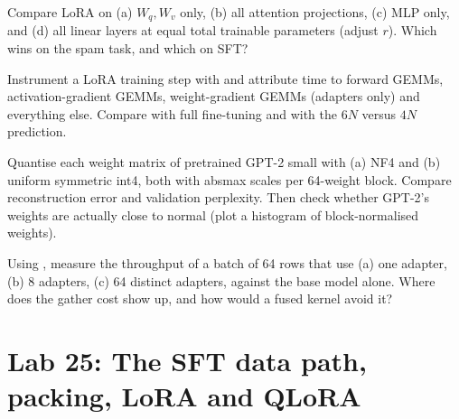 \begin{exercise}
Compare LoRA on (a) $W_q,W_v$ only, (b) all attention projections, (c) MLP only, and
(d) all linear layers at equal total trainable parameters (adjust $r$). Which wins on
the spam task, and which on SFT?
\end{exercise}

\begin{exercise}
Instrument a LoRA training step with  and attribute time to
forward GEMMs, activation-gradient GEMMs, weight-gradient GEMMs (adapters only) and
everything else. Compare with full fine-tuning and with the $6N$ versus $4N$
prediction.
\end{exercise}

\begin{exercise}
Quantise each weight matrix of pretrained GPT-2 small with (a) NF4 and (b) uniform
symmetric int4, both with absmax scales per 64-weight block. Compare reconstruction
error and validation perplexity. Then check whether GPT-2's weights are actually close
to normal (plot a histogram of block-normalised weights).
\end{exercise}

\begin{exercise}
Using , measure the throughput of a batch of 64 rows that use
(a) one adapter, (b) 8 adapters, (c) 64 distinct adapters, against the base model alone.
Where does the gather cost show up, and how would a fused kernel avoid it?
\end{exercise}

\section{Lab 25: The SFT data path, packing, LoRA and QLoRA}\label{sec:instruct:lab}

